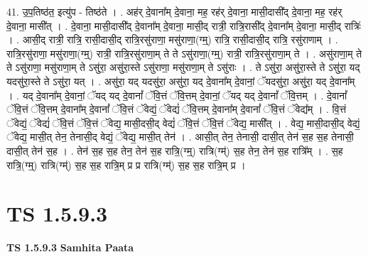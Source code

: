 \documentclass[17pt]{extarticle}
\begin{document}
41. उ॒प॒तिष्ठ॑त॒ इत्यु॑प - तिष्ठ॑ते । . अह॑र् दे॒वाना᳚म् दे॒वाना॒ मह॒ रह॑र् दे॒वाना॒ मासी॒दासी᳚द् दे॒वाना॒ मह॒ रह॑र् दे॒वाना॒ मासी᳚त् । . दे॒वाना॒ मासी॒दासी᳚द् दे॒वाना᳚म् दे॒वाना॒ मासी॒द् रात्री॒ रात्रि॒रासी᳚द् दे॒वाना᳚म् दे॒वाना॒ मासी॒द् रात्रिः॑ । . आसी॒द् रात्री॒ रात्रि॒ रासी॒दासी॒द् रात्रि॒रसु॑राणा॒ मसु॑राणा॒(ग्म्॒) रात्रि॒ रासी॒दासी॒द् रात्रि॒ रसु॑राणाम् । . रात्रि॒रसु॑राणा॒ मसु॑राणा॒(ग्म्॒) रात्री॒ रात्रि॒रसु॑राणा॒म् ते ते ऽसु॑राणा॒(ग्म्॒) रात्री॒ रात्रि॒रसु॑राणा॒म् ते । . असु॑राणा॒म् ते ते ऽसु॑राणा॒ मसु॑राणा॒म् ते ऽसु॑रा॒ असु॑रा॒स्ते ऽसु॑राणा॒ मसु॑राणा॒म् ते ऽसु॑राः । . ते ऽसु॑रा॒ असु॑रा॒स्ते ते ऽसु॑रा॒ यद् यदसु॑रा॒स्ते ते ऽसु॑रा॒ यत् । . असु॑रा॒ यद् यदसु॑रा॒ असु॑रा॒ यद् दे॒वाना᳚म् दे॒वानां॒ ॅयदसु॑रा॒ असु॑रा॒ यद् दे॒वाना᳚म् । . यद् दे॒वाना᳚म् दे॒वानां॒ ॅयद् यद् दे॒वानां᳚ ॅवि॒त्तं ॅवि॒त्तम् दे॒वानां॒ ॅयद् यद् दे॒वानां᳚ ॅवि॒त्तम् । . दे॒वानां᳚ ॅवि॒त्तं ॅवि॒त्तम् दे॒वाना᳚म् दे॒वानां᳚ ॅवि॒त्तं ॅवेद्यं॒ ॅवेद्यं॑ ॅवि॒त्तम् दे॒वाना᳚म् दे॒वानां᳚ ॅवि॒त्तं ॅवेद्य᳚म् । . वि॒त्तं ॅवेद्यं॒ ॅवेद्यं॑ ॅवि॒त्तं ॅवि॒त्तं ॅवेद्य॒ मासी॒दसी॒द् वेद्यं॑ ॅवि॒त्तं ॅवि॒त्तं ॅवेद्य॒ मासी᳚त् । . वेद्य॒ मासी॒दासी॒द् वेद्यं॒ ॅवेद्य॒ मासी॒त् तेन॒ तेनासी॒द् वेद्यं॒ ॅवेद्य॒ मासी॒त् तेन॑ । . आसी॒त् तेन॒ तेनासी॒ दासी॒त् तेन॑ स॒ह स॒ह तेनासी॒ दासी॒त् तेन॑ स॒ह । . तेन॑ स॒ह स॒ह तेन॒ तेन॑ स॒ह रात्रि॒(ग्म्॒) रात्रि(ग्म्॑) स॒ह तेन॒ तेन॑ स॒ह रात्रि᳚म् । . स॒ह रात्रि॒(ग्म्॒) रात्रि(ग्म्॑) स॒ह स॒ह रात्रि॒म् प्र प्र रात्रि(ग्म्॑) स॒ह स॒ह रात्रि॒म् प्र । \newline
\pagebreak
{}
\section*{ TS 1.5.9.3 }

\textbf{TS 1.5.9.3 } \newline
\textbf{Samhita Paata} \newline
\end{document}
